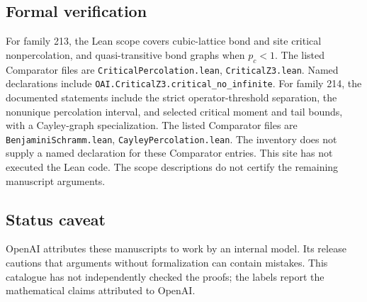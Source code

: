 \documentclass[11pt]{article}
\begin{document}
\subsection{Formal verification}
For family 213, the Lean scope covers cubic-lattice bond and site critical nonpercolation, and quasi-transitive bond graphs when $p_c<1$. The listed Comparator files are \texttt{CriticalPercolation.lean}, \texttt{CriticalZ3.lean}. Named declarations include \texttt{OAI.CriticalZ3.critical\_no\_infinite}. For family 214, the documented statements include the strict operator-threshold separation, the nonunique percolation interval, and selected critical moment and tail bounds, with a Cayley-graph specialization. The listed Comparator files are \texttt{BenjaminiSchramm.lean}, \texttt{CayleyPercolation.lean}. The inventory does not supply a named declaration for these Comparator entries. This site has not executed the Lean code. The scope descriptions do not certify the remaining manuscript arguments.

\subsection{Status caveat}
OpenAI attributes these manuscripts to work by an internal model. Its release cautions that arguments without formalization can contain mistakes. This catalogue has not independently checked the proofs; the labels report the mathematical claims attributed to OpenAI.
\end{document}
